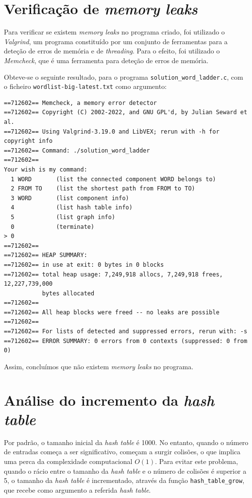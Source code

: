 \documentclass[portuguese,11pt,a4paper,titlepage]{article}
\newcommand{\foreign}[1]{\textit{#1}}
\begin{document}
\section{Verificação de \textit{memory leaks}}
Para verificar se existem \textit{memory leaks} no programa criado, foi utilizado o \foreign{Valgrind}, um programa constituído por um conjunto de ferramentas para a deteção de erros de memória e de \foreign{threading}. Para o efeito, foi utilizado o \foreign{Memcheck}, que é uma ferramenta para deteção de erros de memória.

Obteve-se o seguinte resultado, para o programa \verb|solution_word_ladder.c|, com o ficheiro \verb|wordlist-big-latest.txt| como argumento:

\begin{verbatim}
==712602== Memcheck, a memory error detector
==712602== Copyright (C) 2002-2022, and GNU GPL'd, by Julian Seward et al.
==712602== Using Valgrind-3.19.0 and LibVEX; rerun with -h for copyright info
==712602== Command: ./solution_word_ladder
==712602== 
Your wish is my command:
  1 WORD       (list the connected component WORD belongs to)
  2 FROM TO    (list the shortest path from FROM to TO)
  3 WORD       (list component info)
  4            (list hash table info)
  5            (list graph info)
  0            (terminate)
> 0
==712602== 
==712602== HEAP SUMMARY:
==712602== in use at exit: 0 bytes in 0 blocks
==712602== total heap usage: 7,249,918 allocs, 7,249,918 frees, 12,227,739,000
           bytes allocated
==712602== 
==712602== All heap blocks were freed -- no leaks are possible
==712602== 
==712602== For lists of detected and suppressed errors, rerun with: -s
==712602== ERROR SUMMARY: 0 errors from 0 contexts (suppressed: 0 from 0)
\end{verbatim}

Assim, concluímos que não existem \textit{memory leaks} no programa. 

\pagebreak
\section{Análise do incremento da \textit{hash table}}
Por padrão, o tamanho inicial da \textit{hash table} é 1000. No entanto, quando o número de entradas começa a ser significativo, começam a surgir colisões, o que implica uma perca da complexidade computacional \begin{math}O(1)\end{math}. Para evitar este problema, quando o rácio entre o tamanho da \textit{hash table} e o número de colisões é superior a 5, o tamanho da \textit{hash table} é incrementado, através da função \verb|hash_table_grow|, que recebe como argumento a referida \textit{hash table}.
\end{document}
